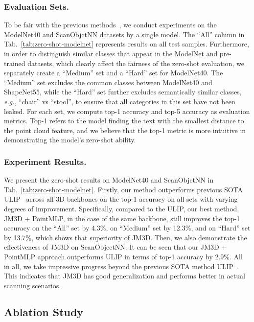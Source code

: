 \documentclass[sigconf]{acmart}
\begin{document}
\subsubsection{\textbf{Evaluation Sets.}} 
To be fair with the previous methods~\cite{xue2022ulip, zhang2022pointclip, hegde2023clip}, we conduct experiments on the ModelNet40 and ScanObjctNN datasets by a single model. The ``All'' column in Tab.~\ref{tab:zero-shot-modelnet} represents results on all test samples. Furthermore, in order to distinguish similar classes that appear in the ModelNet and pre-trained datasets, which clearly affect the fairness of the zero-shot evaluation, we separately create a ``Medium'' set and a ``Hard'' set for ModelNet40. The ``Medium'' set excludes the common classes between ModelNet40 and ShapeNet55, while the ``Hard'' set further excludes semantically similar classes, \emph{e.g.}, ``chair'' vs ``stool'', to ensure that all categories in this set have not been leaked. For each set, we compute top-1 accuracy and top-5 accuracy as evaluation metrics. Top-1 refers to the model finding the text with the smallest distance to the point cloud feature, and we believe that the top-1 metric is more intuitive in demonstrating the model's zero-shot ability.

\subsubsection{\textbf{Experiment Results.}}
We present the zero-shot results on ModelNet40 and ScanObjctNN in Tab.~\ref{tab:zero-shot-modelnet}. Firstly, our method outperforms previous SOTA ULIP~\cite{xue2022ulip} across all 3D backbones on the top-1 accuracy on all sets with varying degrees of improvement. Specifically, compared to the ULIP, our best method, JM3D + PointMLP, in the case of the same backbone, still improves the top-1 accuracy on the ``All'' set by 4.3\%, on ``Medium'' set by 12.3\%, and on ``Hard'' set by 13.7\%, which shows that superiority of JM3D. Then, we also demonstrate the effectiveness of JM3D on ScanObjectNN. It can be seen that our JM3D + PointMLP approach outperforms ULIP in terms of top-1 accuracy by 2.9\%. All in all, we take impressive progress beyond the previous SOTA method ULIP~\cite{xue2022ulip}. This indicates that JM3D has good generalization and performs better in actual scanning scenarios.







\subsection{Ablation Study}
\end{document}
